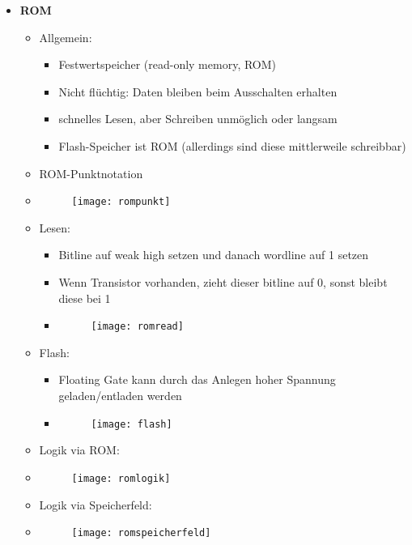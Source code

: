 \begin{itemize}
\item \textbf{ROM}
	\begin{itemize}
	\item Allgemein:
		\begin{itemize}
		\item Festwertspeicher (read-only memory, ROM)
		\item Nicht flüchtig: Daten bleiben beim Ausschalten erhalten
		\item schnelles Lesen, aber Schreiben unmöglich oder langsam
		\item Flash-Speicher ist ROM (allerdings sind diese mittlerweile schreibbar)
		\end{itemize}
	\item ROM-Punktnotation
	\item[]
			\begin{figure}[H]
			\begin{center}
			\texttt{[image: rompunkt]}
			\end{center}
			\end{figure}
	\item Lesen:
		\begin{itemize}
		\item Bitline auf weak high setzen und danach wordline auf 1 setzen
		\item Wenn Transistor vorhanden, zieht dieser bitline auf 0, sonst bleibt diese bei 1
		\item[]
			\begin{figure}[H]
			\begin{center}
			\texttt{[image: romread]}
			\end{center}
			\end{figure}
		\end{itemize}
		
\pagebreak		
		
	\item Flash:
		\begin{itemize}
		\item Floating Gate kann durch das Anlegen hoher Spannung geladen/entladen werden
		\item[]
			\begin{figure}[H]
			\begin{center}
			\texttt{[image: flash]}
			\end{center}
			\end{figure}
		\end{itemize}
	\item Logik via ROM:
	\item[]
			\begin{figure}[H]
			\begin{center}
			\texttt{[image: romlogik]}
			\end{center}
			\end{figure}
	\item Logik via Speicherfeld:
	\item[]
			\begin{figure}[H]
			\begin{center}
			\texttt{[image: romspeicherfeld]}
			\end{center}
			\end{figure}
	

\end{itemize}
\end{itemize}
